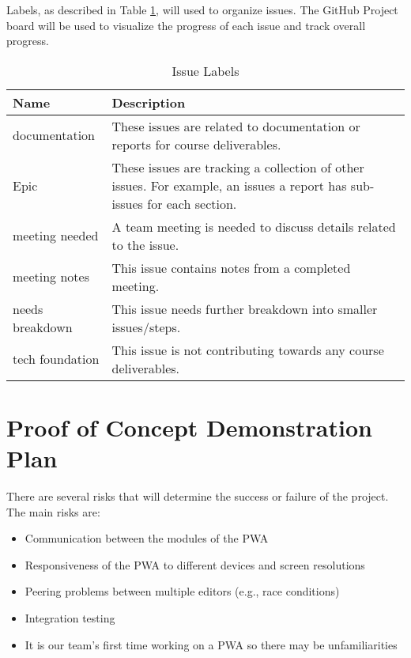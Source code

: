 \documentclass{article}
\begin{document}
Labels, as described in Table \ref{issueLabels}, will used to organize issues. The GitHub Project
board will be used to visualize the progress of each issue and track overall progress.

\begin{table}[H]
  \centering
  \caption{Issue Labels}
  \vspace{5pt}
  \begin{tabular}{|p{}|p{}|}
      \hline
      \textbf{Name} & \textbf{Description}\\
      \hline
      documentation & These issues are related to documentation or reports for course deliverables.\\
      \hline
      Epic & These issues are tracking a collection of other issues. For example, an issues a report
      has sub-issues for each section.\\
      \hline
      meeting needed & A team meeting is needed to discuss details related to the issue.\\
      \hline
      meeting notes & This issue contains notes from a completed meeting.\\
      \hline
      needs breakdown & This issue needs further breakdown into smaller issues/steps.\\
      \hline
      tech foundation & This issue is not contributing towards any course deliverables.\\
      \hline
  \end{tabular}

  \label{issueLabels}
\end{table}


\section{Proof of Concept Demonstration Plan}

There are several risks that will determine the success or failure of the project. The main risks are:

\begin{itemize}
	\item Communication between the modules of the PWA
	\item Responsiveness of the PWA to different devices and screen resolutions
	\item Peering problems between multiple editors (e.g., race conditions)
	\item Integration testing
	\item It is our team's first time working on a PWA so there may be unfamiliarities
\end{itemize}
\end{document}
